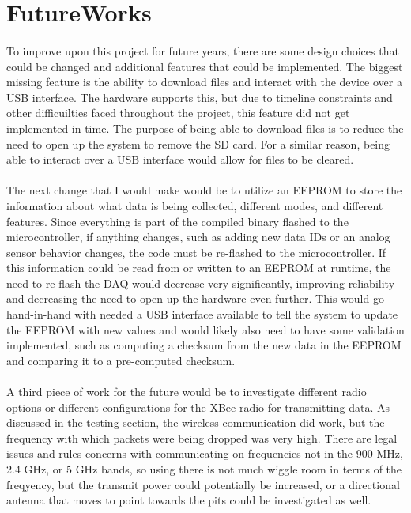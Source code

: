 \section{FutureWorks}

\paragraph{}
To improve upon this project for future years, there are some design choices that could be changed and additional features that could be implemented.
The biggest missing feature is the ability to download files and interact with the device over a USB interface.
The hardware supports this, but due to timeline constraints and other difficuilties faced throughout the project, this feature did not get implemented in time.
The purpose of being able to download files is to reduce the need to open up the system to remove the SD card.
For a similar reason, being able to interact over a USB interface would allow for files to be cleared.

\paragraph{}
The next change that I would make would be to utilize an EEPROM to store the information about what data is being collected, different modes, and different features.
Since everything is part of the compiled binary flashed to the microcontroller, if anything changes, such as adding new data IDs or an analog sensor behavior changes, the code must be re-flashed to the microcontroller.
If this information could be read from or written to an EEPROM at runtime, the need to re-flash the DAQ would decrease very significantly, improving reliability and decreasing the need to open up the hardware even further.
This would go hand-in-hand with needed a USB interface available to tell the system to update the EEPROM with new values and would likely also need to have some validation implemented, such as computing a checksum from the new data in the EEPROM and comparing it to a pre-computed checksum.

\paragraph{}
A third piece of work for the future would be to investigate different radio options or different configurations for the XBee radio for transmitting data.
As discussed in the testing section, the wireless communication did work, but the frequency with which packets were being dropped was very high.
There are legal issues and rules concerns with communicating on frequencies not in the 900 MHz, 2.4 GHz, or 5 GHz bands, so using there is not much wiggle room in terms of the freqyency, but the transmit power could potentially be increased, or a directional antenna that moves to point towards the pits could be investigated as well.

